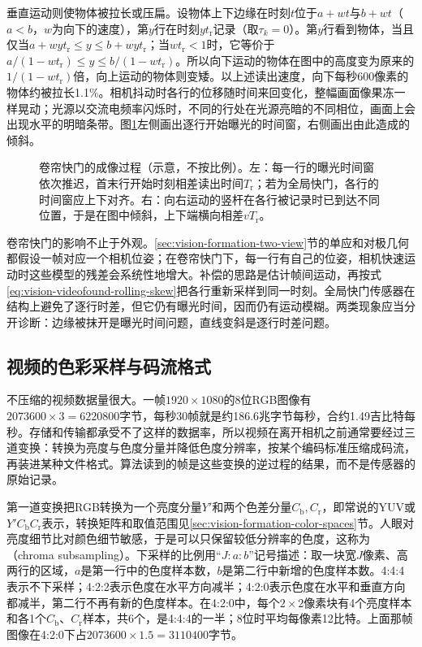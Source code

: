垂直运动则使物体被拉长或压扁。设物体上下边缘在时刻$t$位于$a+wt$与$b+wt$（$a<b$，$w$为向下的速度），第$y$行在时刻$yt_{\mathrm r}$记录（取$\tau_k=0$）。第$y$行看到物体，当且仅当$a+wyt_{\mathrm r}\leq y\leq b+wyt_{\mathrm r}$；当$wt_{\mathrm r}<1$时，它等价于$a/(1-wt_{\mathrm r})\leq y\leq b/(1-wt_{\mathrm r})$。所以向下运动的物体在图中的高度变为原来的$1/(1-wt_{\mathrm r})$倍，向上运动的物体则变矮。以上述读出速度，向下每秒600像素的物体约被拉长1.1\%。相机抖动时各行的位移随时间来回变化，整幅画面像果冻一样晃动；光源以交流电频率闪烁时，不同的行处在光源亮暗的不同相位，画面上会出现水平的明暗条带。图\ref{fig:vision-videofound-rolling-shutter}左侧画出逐行开始曝光的时间窗，右侧画出由此造成的倾斜。

\begin{figure}[htbp]
  \centering
  
  \caption{卷帘快门的成像过程（示意，不按比例）。左：每一行的曝光时间窗依次推迟，首末行开始时刻相差读出时间$T_{\mathrm r}$；若为全局快门，各行的时间窗应上下对齐。右：向右运动的竖杆在各行被记录时已到达不同位置，于是在图中倾斜，上下端横向相差$vT_{\mathrm r}$。}
  \label{fig:vision-videofound-rolling-shutter}
\end{figure}

卷帘快门的影响不止于外观。\ref{sec:vision-formation-two-view}节的单应和对极几何都假设一帧对应一个相机位姿；在卷帘快门下，每一行有自己的位姿，相机快速运动时这些模型的残差会系统性地增大。补偿的思路是估计帧间运动，再按式\eqref{eq:vision-videofound-rolling-skew}把各行重新采样到同一时刻。全局快门传感器在结构上避免了逐行时差，但它仍有曝光时间，因而仍有运动模糊。两类现象应当分开诊断：边缘被抹开是曝光时间问题，直线变斜是逐行时差问题。

\subsection{视频的色彩采样与码流格式}
\label{sec:vision-videofound-formats}

不压缩的视频数据量很大。一帧$1920\times1080$的8位RGB图像有$2073600\times3=6220800$字节，每秒30帧就是约186.6兆字节每秒，合约1.49吉比特每秒。存储和传输都承受不了这样的数据率，所以视频在离开相机之前通常要经过三道变换：转换为亮度与色度分量并降低色度分辨率，按某个编码标准压缩成码流，再装进某种文件格式。算法读到的帧是这些变换的逆过程的结果，而不是传感器的原始记录。

第一道变换把RGB转换为一个亮度分量$Y'$和两个色差分量$C_{\mathrm b},C_{\mathrm r}$，即常说的YUV或$Y'C_{\mathrm b}C_{\mathrm r}$表示，转换矩阵和取值范围见\ref{sec:vision-formation-color-spaces}节。人眼对亮度细节比对颜色细节敏感，于是可以只保留较低分辨率的色度，这称为（chroma subsampling）。下采样的比例用“$J{:}a{:}b$”记号描述：取一块宽$J$像素、高两行的区域，$a$是第一行中的色度样本数，$b$是第二行中新增的色度样本数。4:4:4表示不下采样；4:2:2表示色度在水平方向减半；4:2:0表示色度在水平和垂直方向都减半，第二行不再有新的色度样本。在4:2:0中，每个$2\times2$像素块有4个亮度样本和各1个$C_{\mathrm b}$、$C_{\mathrm r}$样本，共6个，是4:4:4的一半；8位时平均每像素12比特。上面那帧图像在4:2:0下占$2073600\times1.5=3110400$字节。

